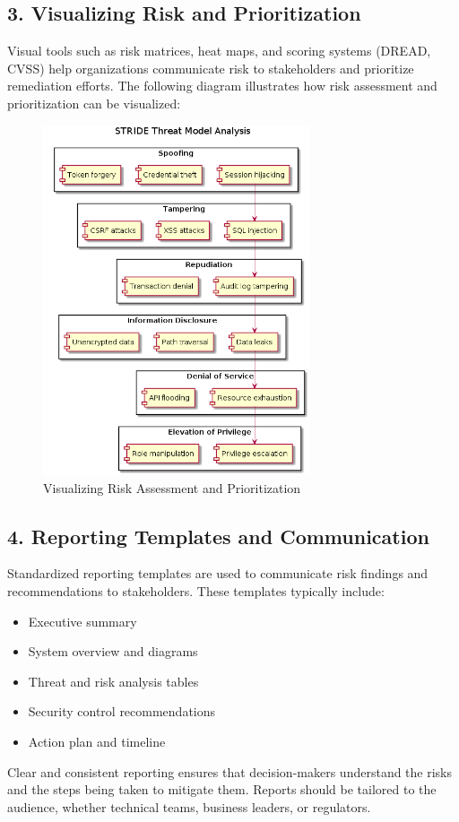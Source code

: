 \subsection*{3. Visualizing Risk and Prioritization}
Visual tools such as risk matrices, heat maps, and scoring systems (DREAD, CVSS) help organizations communicate risk to stakeholders and prioritize remediation efforts. The following diagram illustrates how risk assessment and prioritization can be visualized:
\begin{figure}[H]
	\centering
	\includegraphics[width=0.7\textwidth]{images/stride-analysis}
	\caption{Visualizing Risk Assessment and Prioritization}
\end{figure}

\subsection*{4. Reporting Templates and Communication}
Standardized reporting templates are used to communicate risk findings and recommendations to stakeholders\cite{shostack2014}. These templates typically include:
\begin{itemize}
	\item Executive summary
	\item System overview and diagrams
	\item Threat and risk analysis tables
	\item Security control recommendations
	\item Action plan and timeline
\end{itemize}
Clear and consistent reporting ensures that decision-makers understand the risks and the steps being taken to mitigate them. Reports should be tailored to the audience, whether technical teams, business leaders, or regulators.

